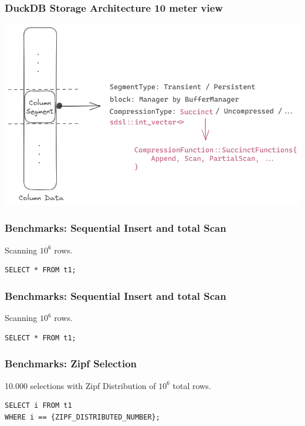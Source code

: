 \documentclass{beamer}
\begin{document}
\begin{frame}
    \frametitle{DuckDB Storage Architecture 10 meter view}
    \includegraphics[width=\framewidth]{figures/excalidraw/duckdb-column-segment-look.png}

\end{frame}


\begin{frame}[fragile]
    \frametitle{Benchmarks: Sequential Insert and total Scan}
Scanning $10^6$ rows.

\begin{lstlisting}[style=SQL]
SELECT * FROM t1;
\end{lstlisting}

    
\end{frame}


\begin{frame}[fragile]
    \frametitle{Benchmarks: Sequential Insert and total Scan}
Scanning $10^6$ rows.

\begin{lstlisting}[style=SQL]
SELECT * FROM t1;
\end{lstlisting}

    
\end{frame}


\begin{frame}[fragile]
    \frametitle{Benchmarks: Zipf Selection}
10.000 selections with Zipf Distribution of $10^6$ total rows.

\begin{lstlisting}[style=SQL]
SELECT i FROM t1 
WHERE i == {ZIPF_DISTRIBUTED_NUMBER};
\end{lstlisting}

    
\end{frame}
\end{document}
